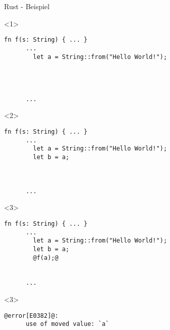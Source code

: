 

\lstset{showstringspaces=true,columns=fullflexible,keepspaces=true}

\begin{frame}[fragile]{Rust - Beispiel}


  \begin{onlyenv}<1> {
    \begin{lstlisting}[frame=single,style=base]
      fn f(s: String) { ... }
      ...
        let a = String::from("Hello World!");




      ...
    \end{lstlisting}
  }
  \end{onlyenv}


  \begin{onlyenv}<2> {
    \begin{lstlisting}[frame=single,style=base]
      fn f(s: String) { ... }
      ...
        let a = String::from("Hello World!");
        let b = a;



      ...
    \end{lstlisting}
  }
  \end{onlyenv}


  \begin{onlyenv}<3> {
    \begin{lstlisting}[frame=single,style=base]
      fn f(s: String) { ... }
      ...
        let a = String::from("Hello World!");
        let b = a;
        @f(a);@


      ...
    \end{lstlisting}
  }
  \end{onlyenv}

  \begin{onlyenv}<3> {
    \begin{lstlisting}[frame=single,style=base]
      @error[E0382]@:
      use of moved value: `a`
    \end{lstlisting}
  }
  \end{onlyenv}


\end{frame}
